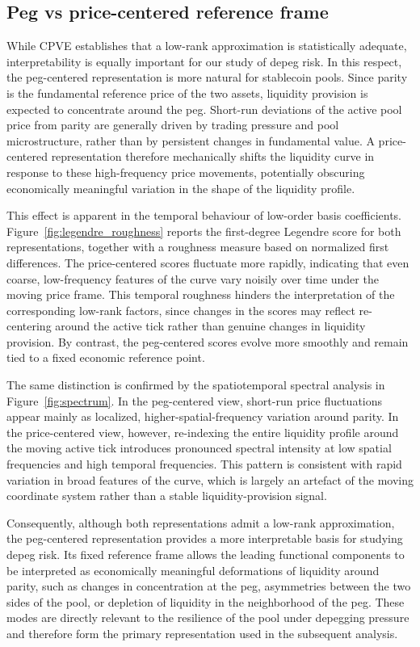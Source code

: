 \documentclass[a4paper,fleqn]{cas-sc}
\begin{document}
\subsection{Peg vs price-centered reference frame}

While CPVE establishes that a low-rank approximation is statistically adequate, interpretability is equally important for our study of depeg risk. In this respect, the peg-centered representation is more natural for stablecoin pools. Since parity is the fundamental reference price of the two assets, liquidity provision is expected to concentrate around the peg. Short-run deviations of the active pool price from parity are generally driven by trading pressure and pool microstructure, rather than by persistent changes in fundamental value. A price-centered representation therefore mechanically shifts the liquidity curve in response to these high-frequency price movements, potentially obscuring economically meaningful variation in the shape of the liquidity profile.

This effect is apparent in the temporal behaviour of low-order basis coefficients. Figure~\ref{fig:legendre_roughness} reports the first-degree Legendre score for both representations, together with a roughness measure based on normalized first differences. The price-centered scores fluctuate more rapidly, indicating that even coarse, low-frequency features of the curve vary noisily over time under the moving price frame. This temporal roughness hinders the interpretation of the corresponding low-rank factors, since changes in the scores may reflect re-centering around the active tick rather than genuine changes in liquidity provision. By contrast, the peg-centered scores evolve more smoothly and remain tied to a fixed economic reference point.

The same distinction is confirmed by the spatiotemporal spectral analysis in Figure~\ref{fig:spectrum}. In the peg-centered view, short-run price fluctuations appear mainly as localized, higher-spatial-frequency variation around parity. In the price-centered view, however, re-indexing the entire liquidity profile around the moving active tick introduces pronounced spectral intensity at low spatial frequencies and high temporal frequencies. This pattern is consistent with rapid variation in broad features of the curve, which is largely an artefact of the moving coordinate system rather than a stable liquidity-provision signal.

Consequently, although both representations admit a low-rank approximation, the peg-centered representation provides a more interpretable basis for studying depeg risk. Its fixed reference frame allows the leading functional components to be interpreted as economically meaningful deformations of liquidity around parity, such as changes in concentration at the peg, asymmetries between the two sides of the pool, or depletion of liquidity in the neighborhood of the peg. These modes are directly relevant to the resilience of the pool under depegging pressure and therefore form the primary representation used in the subsequent analysis.
\end{document}
